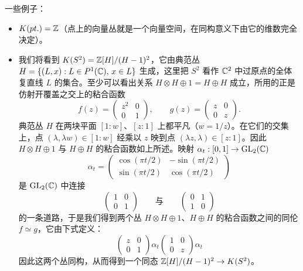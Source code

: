 一些例子：

\begin{itemize}[leftmargin=1.6em,itemsep=2pt]
\item $K(pt.)=\mathbb{Z}$（点上的向量丛就是一个向量空间，在同构意义下由它的维数完全决定）。

\item 我们将看到 $K(S^2)=\mathbb{Z}[H]/(H-1)^2$，它由典范丛 $H=\{(L,x):L\in P^1(\mathbb{C}),\,x\in L\}$ 生成，这里把 $S^2$ 看作 $\mathbb{C}^2$ 中过原点的全体复直线 $L$ 的集合。至少可以看出关系 $H\otimes H\oplus 1=H\oplus H$ 成立，所用的正是仿射开覆盖之交上的粘合函数
\[
f(z)=\begin{pmatrix} z^2 & 0 \\ 0 & 1\end{pmatrix},\qquad g(z)=\begin{pmatrix} z & 0 \\ 0 & z\end{pmatrix}.
\]
典范丛 $H$ 在两块平面 $[1:w]$、$[z:1]$ 上都平凡（$w=1/z$）。在它们的交集上，点 $(\lambda,\lambda w)\in[1:w]$ 经乘以 $z$ 映到点 $(\lambda z,\lambda)\in[z:1]$。因此 $H\otimes H\oplus 1$ 与 $H\oplus H$ 的粘合函数如上所述。映射 $\alpha_t:[0,1]\to \operatorname{GL}_2(\mathbb{C})$
\[
\alpha_t=\begin{pmatrix}\cos(\pi t/2) & -\sin(\pi t/2)\\ \sin(\pi t/2) & \cos(\pi t/2)\end{pmatrix}
\]
是 $\operatorname{GL}_2(\mathbb{C})$ 中连接
\[
\begin{pmatrix} 1 & 0 \\ 0 & 1\end{pmatrix}\qquad\text{与}\qquad\begin{pmatrix} 0 & 1 \\ 1 & 0\end{pmatrix}
\]
的一条道路，于是我们得到两个丛 $H\otimes H\oplus 1$、$H\oplus H$ 的粘合函数之间的同伦 $f\simeq g$，它由下式定义：
\[
\begin{pmatrix} z & 0 \\ 0 & 1\end{pmatrix}\alpha_t\begin{pmatrix} 1 & 0 \\ 0 & z\end{pmatrix}\alpha_t
\]
因此这两个丛同构，从而得到一个同态 $\mathbb{Z}[H]/(H-1)^2\to K(S^2)$。

\end{itemize}
